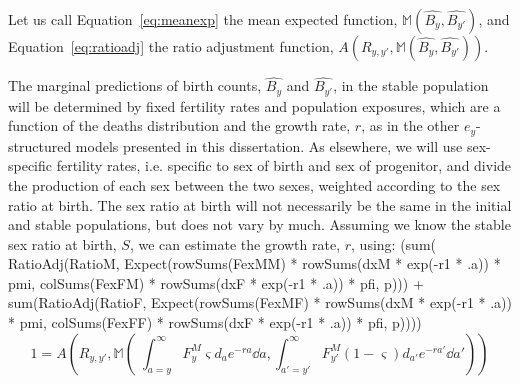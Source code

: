 Let us call Equation~\eqref{eq:meanexp} the mean
expected function, $\mathbb{M}(\widehat{B_y}, \widehat{B_{y'}})$, and
Equation~\eqref{eq:ratioadj} the ratio adjustment function, 
$A(R_{y,y'},\mathbb{M}(\widehat{B_y}, \widehat{B_{y'}}))$.

The marginal predictions of birth counts, $\widehat{B_y}$ and
$\widehat{B_{y'}}$, in the stable population will be determined by
fixed fertility rates and population exposures, which are a function of the
deaths distribution and the growth rate, $r$, as in the other $e_y$-structured 
models presented in this dissertation. As elsewhere, we will use sex-specific
fertility rates, i.e. specific to sex of birth and sex of progenitor, and divide
the production of each sex between the two sexes, weighted according to the sex
ratio at birth. The sex ratio at birth will not necessarily be the same in the
initial and stable populations, but does not vary by much. Assuming we know the
stable sex ratio at birth, $S$, we can estimate the growth rate, $r$, using:
 (sum( RatioAdj(RatioM, 
                                       Expect(rowSums(FexMM) * rowSums(dxM * exp(-r1 * .a)) * pmi,
                                               colSums(FexFM) * rowSums(dxF * exp(-r1 * .a)) * pfi, p))) +
                             sum(RatioAdj(RatioF, 
                                       Expect(rowSums(FexMF) * rowSums(dxM * exp(-r1 * .a)) * pmi,
                                               colSums(FexFF) * rowSums(dxF * exp(-r1 * .a)) * pfi, p))))
\begin{equation}
1 = A\left(R_{y,y'},\mathbb{M}\left(\;\int_{a=y}^\infty F_y^M
\varsigma d_a e^{-ra} \dd a, \int _{a'=y'}^\infty F_{y'}^M
(1-\varsigma) d_{a'} e^{-ra'} \dd a'\right)\right)
\end{equation} 


















